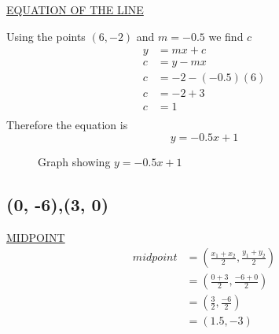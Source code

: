 \documentclass{article}
\begin{document}
\begin{description}
        \underline{EQUATION OF THE LINE}

        Using the points $(6, -2)$ and $m=-0.5$ we find $c$
        $$
            \begin{aligned}
                y & = mx + c         \\
                c & = y - mx         \\
                c & = -2 - (-0.5)(6) \\
                c & = -2+3           \\
                c & = 1              \\
            \end{aligned}
        $$
        Therefore the equation is
        $$
            y = -0.5x+1
        $$
        \begin{figure}[H]
            \begin{center}
                \caption{\label{Graph-2}Graph showing $y=-0.5x+1$}
            \end{center}
        \end{figure}
        \clearpage
        \subsection{(0, -6),(3, 0)}
        \underline{MIDPOINT}
        $$
            \begin{aligned}
                midpoint & = (\frac{x_1+x_2}{2}, \frac{y_1+y_2}{2}) \\
                         & = (\frac{0+3}{2}, \frac{-6+0}{2})        \\
                         & = (\frac{3}{2}, \frac{-6}{2})            \\
                         & = (1.5, -3)                              \\
            \end{aligned}
        $$


\end{description}
\end{document}
